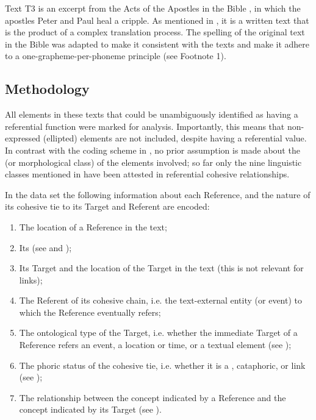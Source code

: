 \documentclass[output=paper
,modfonts
,nonflat]{langsci/langscibook}
\begin{document}
Text T3 is an excerpt from the Acts of the Apostles in the  Bible \citep{Bible2000}, in which the apostles Peter and Paul heal a cripple. As mentioned in , it is a written text that is the product of a complex translation process. The spelling of the original text in the  Bible was adapted to make it consistent with the   texts and make it adhere to a one-grapheme-per-phoneme principle (see Footnote 1).

\subsection{\label{s2.2}Methodology}

All elements in these texts that could be unambiguously identified as having a referential function were marked for analysis. Importantly, this means that non-expressed (ellipted) elements are not included, despite having a referential value. In contrast with the coding scheme in \citet[329–355]{Halliday1976}, no prior assumption is made about the  (or morphological class) of the elements involved; so far only the nine linguistic classes mentioned in  have been attested in referential cohesive relationships. 

In the data set the following information about each Reference, and the nature of its cohesive tie to its Target and Referent are encoded:

\begin{enumerate}
	\item The location of a Reference in the text;
	\item Its  (see  and );
	\item Its Target and the location of the Target in the text (this is not relevant for  links);
	\item The Referent of its cohesive chain, i.e. the text-external entity (or event) to which the Reference eventually refers;
	\item The ontological type of the Target, i.e. whether the immediate Target of a Reference refers an event, a location or time, or a textual element (see );
	\item The phoric status of the cohesive tie, i.e. whether it is a , cataphoric, or  link (see );
	\item The relationship between the concept indicated by a Reference and the concept indicated by its Target (see ).
\end{enumerate}
\end{document}
